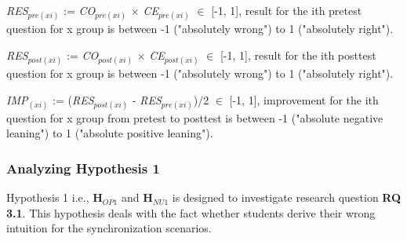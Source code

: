 \textit{RES$_{pre(xi)}$} := \textit{CO$_{pre(xi)}$} $\times$ \textit{CE$_{pre(xi)}$} $\in$ [-1,  1], result for the ith pretest question for x group is between -1 ("absolutely wrong") to 1 ("absolutely right").

\textit{RES$_{post(xi)}$} := \textit{CO$_{post(xi)}$} $\times$ \textit{CE$_{post(xi)}$} $\in$ [-1,  1], result for the ith posttest question for x group is between -1 ("absolutely wrong") to 1 ("absolutely right").

\textit{IMP$_{(xi)}$} := (\textit{RES$_{post(xi)}$} - \textit{RES$_{pre(xi)}$})/2 $\in$ [-1,  1], improvement for the ith question for x group from pretest to posttest is between -1 ("absolute negative leaning") to 1 ("absolute positive leaning").

\subsubsection{Analyzing Hypothesis 1}\label{subsubsec:hypothesis1}
Hypothesis 1 i.e., \textbf{H$_{OP1}$} and \textbf{H$_{NU1}$} is designed to investigate research question \textbf{RQ 3.1}. This hypothesis deals with the fact whether students derive their wrong intuition for the synchronization scenarios.

